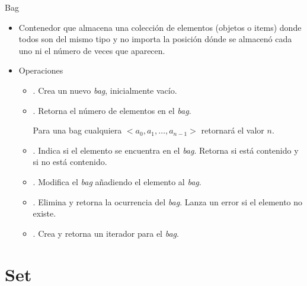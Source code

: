 \documentclass[10pt,envcountsect,spanish]{beamer}
\begin{document}
\begin{frame}{Bag}

\begin{itemize}
\item Contenedor que almacena una colección de elementos (objetos o items) donde todos son del mismo tipo y no importa la posición dónde se almacenó cada uno ni el número de veces que aparecen.

\item Operaciones
\begin{itemize}
\item {}. Crea un nuevo \textit{bag}, inicialmente vacío.

\item {}. Retorna el número de elementos en el \textit{bag}.

Para una bag cualquiera $<a_0, a_1, \ldots, a_{n-1}>$ retornará el valor $n$.

\item {}. Indica si el elemento  se encuentra en el \textit{bag}. Retorna  si está contenido y  si no está contenido.

\item {}. Modifica el \textit{bag} añadiendo  el elemento  al \textit{bag}.

\item {}. Elimina y retorna la ocurrencia  del \textit{bag}. Lanza un error si el elemento no existe.

\item {}. Crea y retorna un iterador para el \textit{bag}.
\end{itemize}

\end{itemize}

\end{frame}



\section{Set}
\end{document}
